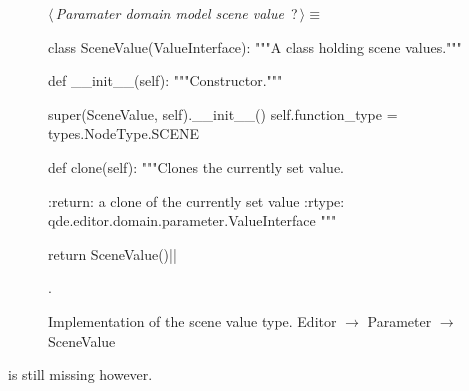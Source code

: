 \documentclass[%
    a4paper,    %
    justified,  %
    nobib,      %
    openany     %
]{tufte-book}
\makeatletter
\renewcommand{\label}[1]{\@tufte@label{##1}}%
\makeatother
\begin{document}
\begin{figure}
\begin{flushleft} \small
\begin{minipage}{\linewidth}\label{scrap133}\raggedright\small
{} $\langle\,${\itshape Paramater domain model scene value}\nobreak\ {\footnotesize {?}}$\,\rangle\equiv$
\vspace{-1ex}
\begin{pythoncode}
class SceneValue(ValueInterface):
    """A class holding scene values."""

    def __init__(self):
        """Constructor."""

        super(SceneValue, self).__init__()
        self.function_type = types.NodeType.SCENE

    def clone(self):
        """Clones the currently set value.

        :return: a clone of the currently set value
        :rtype:  qde.editor.domain.parameter.ValueInterface
        """

        return SceneValue()|\NWsep|
\end{pythoncode}
\vspace{1.5ex}
\footnotesize
\begin{list}{}{\setlength{\itemsep}{-\parsep}\setlength{\itemindent}{-\leftmargin}}
\item {\NWtxtMacroNoRef}.

\item{}
\end{list}
\end{minipage}\vspace{4ex}
\end{flushleft}
\caption{Implementation of the scene value type.
  \newline{}\newline{}Editor $\rightarrow$ Parameter $\rightarrow$
  SceneValue}
\label{editor:lst:parameter:scene-value}
\end{figure}

 is still missing
however.
\end{document}
